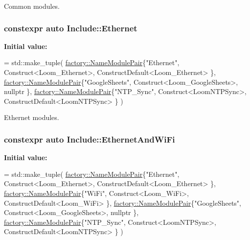 Common modules. 

\subsubsection[{\texorpdfstring{Ethernet}{Ethernet}}]{\setlength{\rightskip}{0pt plus 5cm}constexpr auto Include\+::\+Ethernet}\hypertarget{namespace_include_a68386b4fe2e4f182c18b0f4b1e1ca554}{}\label{namespace_include_a68386b4fe2e4f182c18b0f4b1e1ca554}
{\bfseries Initial value\+:}
\begin{DoxyCode}
= std::make\_tuple(
                \hyperlink{structfactory_1_1_name_module_pair}{factory::NameModulePair}\{\textcolor{stringliteral}{"Ethernet"},      Construct<Loom\_Ethernet>,       
      ConstructDefault<Loom\_Ethernet> \},
                \hyperlink{structfactory_1_1_name_module_pair}{factory::NameModulePair}\{\textcolor{stringliteral}{"GoogleSheets"},  
      Construct<Loom\_GoogleSheets>,   \textcolor{keyword}{nullptr} \},
                \hyperlink{structfactory_1_1_name_module_pair}{factory::NameModulePair}\{\textcolor{stringliteral}{"NTP\_Sync"},  Construct<LoomNTPSync>,         
      ConstructDefault<LoomNTPSync> \}
            )
\end{DoxyCode}


Ethernet modules. 

\subsubsection[{\texorpdfstring{Ethernet\+And\+Wi\+Fi}{EthernetAndWiFi}}]{\setlength{\rightskip}{0pt plus 5cm}constexpr auto Include\+::\+Ethernet\+And\+Wi\+Fi}\hypertarget{namespace_include_a5f31f767a008f601b5d4f5c3aff90e89}{}\label{namespace_include_a5f31f767a008f601b5d4f5c3aff90e89}
{\bfseries Initial value\+:}
\begin{DoxyCode}
= std::make\_tuple(
                \hyperlink{structfactory_1_1_name_module_pair}{factory::NameModulePair}\{\textcolor{stringliteral}{"Ethernet"},      Construct<Loom\_Ethernet>,       
      ConstructDefault<Loom\_Ethernet> \},
                \hyperlink{structfactory_1_1_name_module_pair}{factory::NameModulePair}\{\textcolor{stringliteral}{"WiFi"},          Construct<Loom\_WiFi>,           
      ConstructDefault<Loom\_WiFi> \},
                \hyperlink{structfactory_1_1_name_module_pair}{factory::NameModulePair}\{\textcolor{stringliteral}{"GoogleSheets"},  
      Construct<Loom\_GoogleSheets>,   \textcolor{keyword}{nullptr} \},
                \hyperlink{structfactory_1_1_name_module_pair}{factory::NameModulePair}\{\textcolor{stringliteral}{"NTP\_Sync"},  Construct<LoomNTPSync>,         
      ConstructDefault<LoomNTPSync> \}
            )
\end{DoxyCode}


